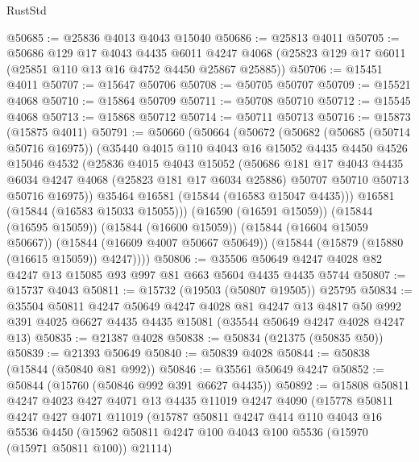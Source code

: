 \begin{lexlean}{RustStd}
\begin{coremodule}
@50685 := @25836 @4013 @4043 @15040
@50686 := @25813 @4011
@50705 := @50686
    @129
    @17
    @4043
    @4435
    @6011
    @4247
    @4068
    (@25823 @129 @17 @6011 (@25851 @110 @13 @16 @4752 @4450 @25867 @25885))
@50706 := @15451 @4011
@50707 := @15647 @50706
@50708 := @50705 @50707
@50709 := @15521 @4068
@50710 := @15864 @50709
@50711 := @50708 @50710
@50712 := @15545 @4068
@50713 := @15868 @50712
@50714 := @50711 @50713
@50716 := @15873 (@15875 @4011)
@50791 := @50660
    (@50664
      (@50672
        (@50682
          (@50685 (@50714 @50716 @16975))
          (@35440
            @4015
            @110
            @4043
            @16
            @15052
            @4435
            @4450
            @4526
            @15046
            @4532
            (@25836
              @4015
              @4043
              @15052
              (@50686
                @181
                @17
                @4043
                @4435
                @6034
                @4247
                @4068
                (@25823 @181 @17 @6034 @25886)
                @50707
                @50710
                @50713
                @50716
                @16975))
            @35464
            @16581
            (@15844 (@16583 @15047 @4435)))
          @16581
          (@15844 (@16583 @15033 @15055)))
        (@16590 (@16591 @15059))
        (@15844 (@16595 @15059))
        (@15844 (@16600 @15059))
        (@15844 (@16604 @15059 @50667))
        (@15844 (@16609 @4007 @50667 @50649))
        (@15844 (@15879 (@15880 (@16615 @15059)) @4247))))
@50806 := @35506 @50649 @4247 @4028 @82 @4247 @13 @15085 @93 @997 @81 @663 @5604 @4435 @4435 @5744
@50807 := @15737 @4043
@50811 := @15732 (@19503 (@50807 @19505)) @25795
@50834 := @35504
    @50811
    @4247
    @50649
    @4247
    @4028
    @81
    @4247
    @13
    @4817
    @50
    @992
    @391
    @4025
    @6627
    @4435
    @4435
    @15081
    (@35544 @50649 @4247 @4028 @4247 @13)
@50835 := @21387 @4028
@50838 := @50834 (@21375 (@50835 @50))
@50839 := @21393 @50649
@50840 := @50839 @4028
@50844 := @50838 (@15844 (@50840 @81 @992))
@50846 := @35561 @50649 @4247
@50852 := @50844 (@15760 (@50846 @992 @391 @6627 @4435))
@50892 := @15808
    @50811
    @4247
    @4023
    @427
    @4071
    @13
    @4435
    @11019
    @4247
    @4090
    (@15778
      @50811
      @4247
      @427
      @4071
      @11019
      (@15787
        @50811
        @4247
        @414
        @110
        @4043
        @16
        @5536
        @4450
        (@15962 @50811 @4247 @100 @4043 @100 @5536 (@15970 (@15971 @50811 @100)) @21114)

\end{coremodule}
\end{lexlean}
